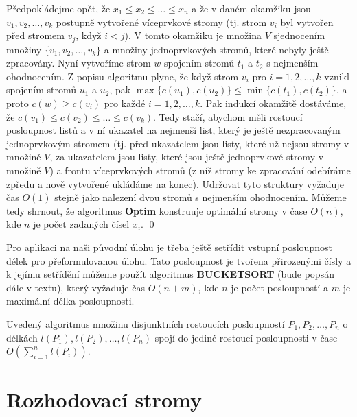 \documentclass[a4paper,12pt]{article}
\begin{document}
Předpokládejme opět, že $x_1\le x_2\le\dots\le 
x_n$ a že v daném 
okamžiku jsou $v_1,v_2,\dots,v_k$ postupně vytvořené víceprvkové stromy
(tj. strom $v_i$ byl vytvořen před stromem $v_j$, když $
i<j$). V 
tomto okamžiku je množina $V$ sjednocením množiny $\{
v_1,v_2,\dots,v_k\}$ 
a množiny jednoprvkových stromů, které nebyly ještě 
zpracovány. Nyní vytvoříme strom $w$ spojením 
stromů $t_1$ a $t_2$ s nejmenším ohodnocením. Z popisu algoritmu plyne, že když 
strom $v_i$ pro $i=1,2,\dots,k$ vznikl spojením stromů $
u_1$ 
a $u_2$, pak $\max\{c(u_1),c(u_2)\}\le\min\{c(t_1),c(t_2)\}$, a proto $
c(w)\ge c(v_i)$ 
pro každé $i=1,2,\dots,k$. Pak indukcí 
okamžitě dostáváme, že $c(v_1)\le c(v_2)\le\dots\le 
c(v_k)$.  Tedy stačí, 
abychom měli rostoucí posloupnost listů a v ní 
ukazatel na nej\-menší list, který je ještě 
nezpracovaným jednoprvkovým stro\-mem (tj. před ukazatelem jsou 
listy, které už nejsou stromy v množině $V$, 
za ukazatelem jsou listy, které jsou ještě jednoprvkové 
stro\-my v množině $V$) a frontu víceprvkových 
stromů (z níž stromy ke zpracování odebíráme 
zpředu a nově vytvořené  
ukládáme na konec).  Udržovat tyto struktury vyža\-duje čas 
$O(1)$ stejně jako nalezení dvou stromů s nej\-menším 
ohodnocením. Můžeme tedy shrnout, že algoritmus 
{\bf Optim} konstruuje optimální stromy v čase $O(n)$, kde $
n$ je počet 
zadaných čísel $x_i$. \qed
\enddemo

Pro aplikaci na naši původní úlohu je 
třeba  
ještě setřídit vstupní posloupnost délek pro přeformu\-lo\-vanou úlohu.
Tato posloupnost je tvořena přirozenými čísly a 
k jejímu setřídění  
můžeme použít algoritmus {\bf BUCKETSORT} (bude 
popsán dále v textu), který 
vyžaduje čas $O(n+m)$, kde $n$ je počet posloupností a $
m$ je 
maximální délka posloupnosti.

\begin{veta}Uvedený algoritmus množinu 
disjunktních rostoucích 
posloupností $P_1,P_2,\dots,P_n$ o délkách $l(P_1),l(P_2)
,\dots,l(P_n)$ spojí 
do jediné rostoucí posloupnosti v čase 
$O(\sum_{i=1}^nl(P_i))$.
\end{veta}

\section{{Rozhodovací stromy}}
\end{document}
